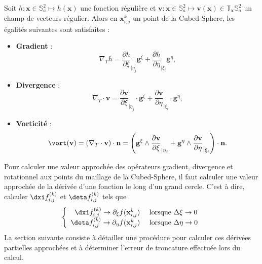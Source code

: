 \begin{theoreme}
Soit $h : \mathbf{x} \in \mathbb{S}_a^2 \mapsto h(\mathbf{x})$ une fonction régulière et $\mathbf{v} : \mathbf{x} \in \mathbb{S}_a^2 \mapsto \mathbf{v}(\mathbf{x}) \in \mathbb{T}_{\mathbf{x}} \mathbb{S}_a^2$ un champ de vecteurs régulier. Alors en $\mathbf{x}_{i,j}^k$ un point de la Cubed-Sphere, les égalités suivantes sont satisfaites :
\begin{itemize}
\item \textbf{Gradient} :
\begin{equation}
\nabla_T h = \dfrac{\partial h}{\partial \xi}_{|\eta_j} \mathbf{g}^{\xi} + \dfrac{\partial h}{\partial \eta}_{|\xi_i} \mathbf{g}^{\eta},
\end{equation}

\item \textbf{Divergence} :
\begin{equation}
\nabla_T \cdot \mathbf{v} = \dfrac{\partial \mathbf{v}}{\partial \xi}_{|\eta_j} \cdot \mathbf{g}^{\xi} + \dfrac{\partial \mathbf{v}}{\partial \eta}_{|\xi_i} \cdot \mathbf{g}^{\eta},
\label{eq:divergence_v1}
\end{equation}

\item \textbf{Vorticité} :
\begin{equation}
\vort( \mathbf{v} ) = \left( \nabla_T \cdot \mathbf{v} \right) \cdot \mathbf{n} =  \left( \mathbf{g}^{\xi} \wedge \dfrac{\partial \mathbf{v}}{\partial \xi}_{|\eta_j} + \mathbf{g}^{\eta} \wedge \dfrac{\partial \mathbf{v}}{\partial \eta}_{|\xi_i} \right) \cdot \mathbf{n}.
\end{equation}
\end{itemize} 
\end{theoreme}

Pour calculer une valeur approchée des opérateurs gradient, divergence et rotationnel aux points du maillage de la Cubed-Sphere, il faut calculer une valeur approchée de la dérivée d'une fonction le long d'un grand cercle. C'est à dire, calculer $\dxi f_{i,j}^{(k)}$ et $\deta f_{i,j}^{(k)}$ tels que 
\begin{equation}
\left\lbrace
\begin{array}{rl}
\dxi f_{i,j}^{(k)} \rightarrow \partial_{\xi} f ( \mathbf{x}_{i,j}^k) & \text{ lorsque } \Delta \xi \rightarrow 0\\
\deta f_{i,j}^{(k)} \rightarrow \partial_{\eta} f ( \mathbf{x}_{i,j}^k) & \text{ lorsque } \Delta \eta \rightarrow 0
\end{array}
\right.
\end{equation}
La section suivante consiste à détailler une procédure pour calculer ces dérivées partielles approchées et à déterminer l'erreur de troncature effectuée lors du calcul.





